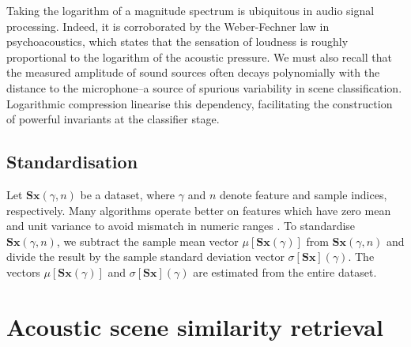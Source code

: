 \documentclass[smallextended]{svjour3}
\begin{document}
Taking the logarithm of a magnitude spectrum is ubiquitous in audio signal processing.
Indeed, it is corroborated by the Weber-Fechner law in psychoacoustics, which states that the sensation of loudness is roughly proportional to the logarithm of the acoustic pressure.
We must also recall that the measured amplitude of sound sources often decays polynomially with the distance to the microphone--a source of spurious variability in scene classification.
Logarithmic compression linearise this dependency, facilitating the construction of powerful invariants at the classifier stage.

\subsection{Standardisation}
\label{sec:stand}

Let $\mathbf{S}\boldsymbol{x}(\gamma,n)$ be a dataset, where $\gamma$ and $n$ denote feature and sample indices, respectively.
Many algorithms operate better on features which have zero mean and unit variance to avoid mismatch in numeric ranges \cite{Hsu2003}.
To standardise $\mathbf{S}\boldsymbol{x}(\gamma,n)$, we subtract the sample mean vector $\mu[\mathbf{S}\boldsymbol{x}(\gamma)]$ from $\mathbf{S}\boldsymbol{x}(\gamma,n)$ and divide the result by the sample standard deviation vector $\sigma[\mathbf{S}\boldsymbol{x}] (\gamma)$.
The vectors $\mu[\mathbf{S}\boldsymbol{x}(\gamma)]$ and $\sigma[\mathbf{S}\boldsymbol{x}](\gamma)$ are estimated from the entire dataset.

\section{Acoustic scene similarity retrieval}
\label{sec:object}


\end{document}

